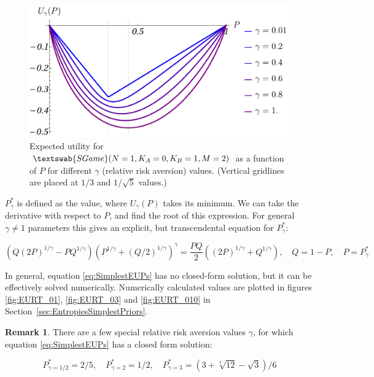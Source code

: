 \documentclass{article}
\theoremstyle{definition}
\newtheorem*{remark}{Remark}
\newcommand{\SG}[1]{$\textswab{SGame}(#1)$}
\begin{document}
\begin{figure}[H]
    \centering
    \includegraphics[width=12 cm]{img/EUP_1012_01.pdf}
    \caption{Expected utility for \SG{N=1, K_A=0, K_B=1, M=2} as a function of $P$ for different $\gamma$ (relative risk aversion) values.
    (Vertical gridlines are placed at $1/3$ and $1/\sqrt{5}$ values.)}
    \label{fig:EUP_1012_01}
\end{figure}

$P^*_\gamma$ is defined as the value, where $U_\gamma(P)$ takes its minimum.
We can take the derivative with respect to $P$, and find the root of this expression. For general $\gamma \ne 1$ parameters this gives an explicit, but transcendental equation for $P^*_\gamma$:

\begin{equation}
\label{eq:SimplestEUPs}
    \left (
    Q (2 P)^{1/\gamma} - P Q^{1/\gamma}
    \right )
    \left (
    P^{1/\gamma} + (Q/2)^{1/\gamma}
    \right )^\gamma 
    =
    \frac{P Q}{2}
    \left (
    (2 P)^{1/\gamma} + Q^{1/\gamma}
    \right ), \quad Q=1-P, \quad P=P^*_\gamma
\end{equation}

In general, equation \eqref{eq:SimplestEUPs} has no closed-form solution, but it can be effectively solved numerically.
Numerically calculated values are plotted in figures \ref{fig:EURT_01}, \ref{fig:EURT_03} and \ref{fig:EURT_010} in Section~\ref{sec:EntropiesSimplestPriors}.

\begin{remark}
    There are a few special relative risk aversion values $\gamma$, for which equation \eqref{eq:SimplestEUPs} has a closed form solution:

    \begin{equation}
        P^*_{\gamma=1/2} = 2/5, \quad
        P^*_{\gamma=2} = 1/2, \quad
        P^*_{\gamma=3} = (3 + \sqrt[4]{12} - \sqrt{3})/6
    \end{equation}

\end{remark}
\end{document}
